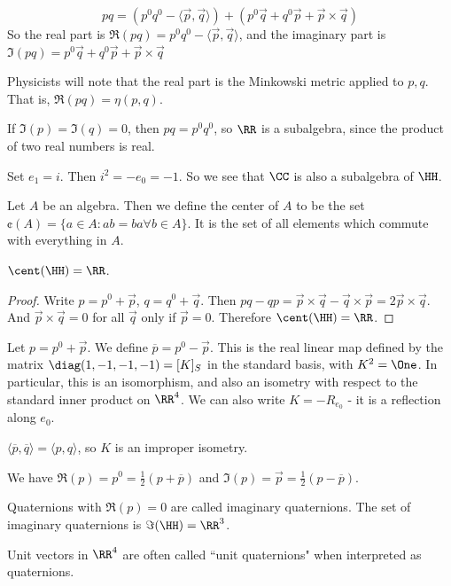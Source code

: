 \begin{equation}
    pq = (p^0 q^0 - \langle \vec{p},\vec{q}\rangle) + (p^0 \vec{q}+q^0\vec{p}+\vec{p}\times\vec{q})\label{eq:quaternion_mult}
\end{equation}
So the real part is $\Re(pq) = p^0 q^0 - \langle \vec{p},\vec{q}\rangle$, and the imaginary part is $\Im(pq) = p^0 \vec{q}+q^0\vec{p}+\vec{p}\times\vec{q}$
\begin{physics*}
    Physicists will note that the real part is the Minkowski metric applied to $p,q$. That is, $\Re(pq) = \eta(p,q)$.
\end{physics*}
\begin{remark*}
    If $\Im(p)=\Im(q)=0$, then $pq = p^0 q^0$, so $\RR$ is a subalgebra, since the product of two real numbers is real.
\end{remark*}
\begin{remark*}
    Set $e_1 = i$. Then $i^2 = -e_0 = -1$. So we see that $\CC$ is also a subalgebra of $\HH$.
\end{remark*}

\begin{defn} Let $A$ be an algebra. Then we define the center of $A$ to be the set $\cent(A) = \{a\in A : ab = ba \forall b\in A\}$. It is the set of all elements which commute with everything in $A$.
\end{defn}
\begin{lemma}
    $\cent(\HH) = \RR$.
\end{lemma}
\begin{proof}
    Write $p = p^0 + \vec{p}$, $q=q^0+\vec{q}$. Then $pq-qp = \vec{p}\times\vec{q}-\vec{q}\times\vec{p}=2\vec{p}\times\vec{q}$. And $\vec{p}\times \vec{q}=0$ for all $\vec{q}$ only if $\vec{p}=0$. Therefore $\cent(\HH)=\RR$.
\end{proof}
\begin{defn}
Let $p = p^0 + \vec{p}$. We define $\overline{p}=p^0-\vec{p}$. This is the real linear map defined by the matrix $\diag(1,-1,-1,-1)=[K]_S$ in the standard basis, with $K^2 = \One$. In particular, this is an isomorphism, and also an isometry with respect to the standard inner product on $\RR^4$. We can also write $K = -R_{e_0}$ - it is a reflection along $e_0$.
\end{defn}
\begin{remark*}
    $\langle \overline{p},\overline{q}\rangle = \langle p,q\rangle$, so $K$ is an improper isometry.
\end{remark*}
\begin{remark*}
    We have $\Re(p) = p^0 = \frac{1}{2}(p+\overline{p})$ and $\Im(p) = \vec{p} = \frac{1}{2}(p-\overline{p})$.
\end{remark*}
\begin{remark*}
    Quaternions with $\Re(p) = 0$ are called imaginary quaternions. The set of imaginary quaternions is $\Im(\HH) =\RR^3$.
\end{remark*}
\begin{remark*}
    Unit vectors in $\RR^4$ are often called ``unit quaternions" when interpreted as quaternions. 
\end{remark*}

